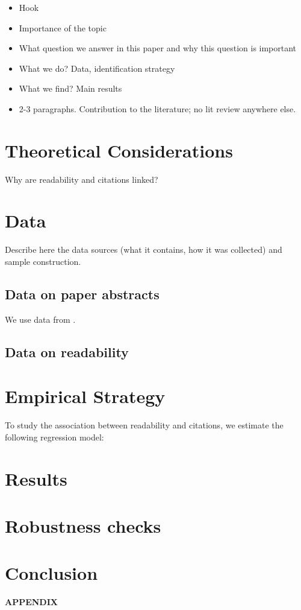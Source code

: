 \documentclass[
  12pt]{article}
\providecommand{\tightlist}{%
  \setlength{\itemsep}{0pt}\setlength{\parskip}{0pt}}
\begin{document}
\begin{itemize}
\tightlist
\item
  Hook
\item
  Importance of the topic
\item
  What question we answer in this paper and why this question is
  important
\item
  What we do? Data, identification strategy
\item
  What we find? Main results
\item
  2-3 paragraphs. Contribution to the literature; no lit review anywhere
  else.
\end{itemize}

\section{Theoretical Considerations}\label{theoretical-considerations}

Why are readability and citations linked?

\section{Data}\label{sec-data}

Describe here the data sources (what it contains, how it was collected)
and sample construction.

\subsection{Data on paper abstracts}\label{data-on-paper-abstracts}

We use data from \citet{hengel2022}.

\subsection{Data on readability}\label{data-on-readability}

\section{Empirical Strategy}\label{sec-meth}

To study the association between readability and citations, we estimate
the following regression model:

\section{Results}\label{sec-res}

\section{Robustness checks}\label{robustness-checks}

\section{Conclusion}\label{sec-conc}

\label{appendix}
\bigskip

\begin{center}

{\large\bf APPENDIX}

\end{center}



\end{document}
